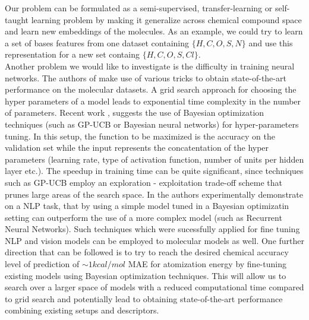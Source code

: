 \documentclass[10pt,journal,a4paper]{IEEEtran}
\begin{document}
%

Our problem can be formulated as a semi-supervised, transfer-learning or self-taught learning problem by making it generalize across chemical compound space and learn new embeddings of the molecules. As an example, we could try to learn a set of bases features from one dataset containing $\{H, C, O, S, N\}$ and use this representation for a new set containg $\{H, C, O, S, Cl\}$.\\[0.05in]



Another problem we would like to investigate is the difficulty in training neural networks. The authors of \cite{montavon2012learning} make use of various tricks \cite{tricks} to obtain state-of-the-art performance on the molecular datasets. A grid search approach for choosing the hyper parameters of a model leads to exponential time complexity in the number of parameters.
Recent work \cite{hyperparameter}, \cite{citeulike} suggests the use of Bayesian optimization techniques (such as GP-UCB or Bayesian neural networks) for hyper-parameters tuning. In this setup, the function to be maximized is the accuracy on the validation set while the input represents the concatentation of the hyper parameters (learning rate, type of activation function, number of units per hidden layer etc.). The speedup in training time can be quite significant, since techniques such as GP-UCB employ an exploration - exploitation trade-off scheme that prunes large areas of the search space.
In \cite{citeulike} the authors experimentally demonstrate on a NLP task, that by using a simple model tuned in a Bayesian optimizatin setting can outperform the use of a more complex model (such as Recurrent Neural Networks).
Such techniques which were sucessfully applied for fine tuning NLP and vision models can be employed to molecular models as well.
One further direction that can be followed is to try to reach the desired chemical accuracy level of prediction of $\sim 1kcal/mol$ MAE for atomization energy by fine-tuning existing models using Bayesian optimization techniques. 
This will allow us to search over a larger space of models with a reduced computational time compared to grid search and potentially lead to obtaining state-of-the-art performance combining existing setups and descriptors.
\end{document}
